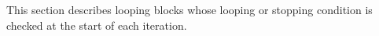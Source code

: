 This section describes looping blocks whose looping or
stopping condition is checked at the start of each iteration.

\subsubsection{}


\subsubsection{}


\subsubsection{}


\subsubsection{}

